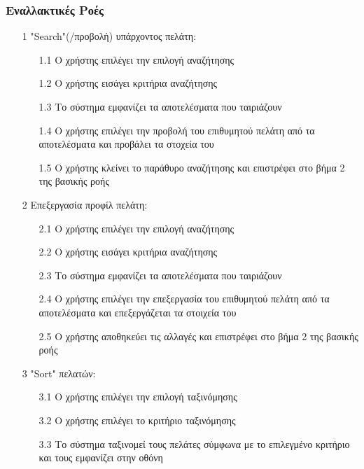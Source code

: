 \documentclass[12pt,a4paper,twoside]{book}
\begin{document}
\subsubsection{Εναλλακτικές Ροές}
\begin{enumerate}
  \item[1 ] "Search"(/προβολή) υπάρχοντος πελάτη:
        \begin{enumerate}
          \item[1.1 ] Ο χρήστης επιλέγει την επιλογή αναζήτησης
          \item[1.2 ] Ο χρήστης εισάγει κριτήρια αναζήτησης %
          \item[1.3 ] Το σύστημα εμφανίζει τα αποτελέσματα που ταιριάζουν
          \item[1.4 ] Ο χρήστης επιλέγει την προβολή του επιθυμητού πελάτη από τα αποτελέσματα και προβάλει τα στοχεία του
          \item[1.5 ] Ο χρήστης κλείνει το παράθυρο αναζήτησης και επιστρέφει στο βήμα 2 της βασικής ροής
        \end{enumerate}
  \item[2 ] Επεξεργασία προφίλ πελάτη:
        \begin{enumerate}
          \item [2.1 ] Ο χρήστης επιλέγει την επιλογή αναζήτησης
          \item [2.2 ] Ο χρήστης εισάγει κριτήρια αναζήτησης %
          \item [2.3 ] Το σύστημα εμφανίζει τα αποτελέσματα που ταιριάζουν
          \item [2.4 ] Ο χρήστης επιλέγει την επεξεργασία του επιθυμητού πελάτη από τα αποτελέσματα και επεξεργάζεται τα στοιχεία του
          \item [2.5 ] Ο χρήστης αποθηκεύει τις αλλαγές και επιστρέφει στο βήμα 2 της βασικής ροής
        \end{enumerate}
  \item[3 ] "Sort" πελατών:
        \begin{enumerate}
          \item [3.1 ] Ο χρήστης επιλέγει την επιλογή ταξινόμησης
          \item [3.2 ] Ο χρήστης επιλέγει το κριτήριο ταξινόμησης %
          \item [3.3 ] Το σύστημα ταξινομεί τους πελάτες σύμφωνα με το επιλεγμένο κριτήριο και τους εμφανίζει στην οθόνη
        \end{enumerate}

\end{enumerate}
\end{document}
